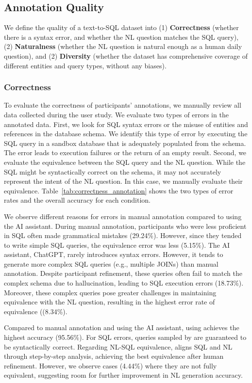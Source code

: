 \subsection{Annotation Quality}
We define the quality of a text-to-SQL dataset into (1) \textbf{Correctness} (whether there is a syntax error, and whether the NL question matches the SQL query), (2) \textbf{Naturalness} (whether the NL question is natural enough as a human daily question), and (2) \textbf{Diversity} (whether the dataset has comprehensive coverage of different entities and query types, without any biases).

\subsubsection{\textbf{Correctness}}

To evaluate the correctness of participants' annotations, we manually review all data collected during the user study. We evaluate two types of errors in the annotated data. 
First, we look for SQL syntax errors or the misuse of entities and references in the database schema. 
We identify this type of error by executing the SQL query in a sandbox database that is adequately populated from the schema.
The error leads to execution failures or the return of an empty result.
Second, we evaluate the equivalence between the SQL query and the NL question. While the SQL might be syntactically correct on the schema, it may not accurately represent the intent of the NL question. In this case, we manually evaluate their equivalence.
Table~\ref{tab:correctness_annotation} shows the two types of error rates and the overall accuracy for each condition.

We observe different reasons for errors in manual annotation compared to using the AI assistant. During manual annotation, participants who were less proficient in SQL often made grammatical mistakes (29.24\%). However, since they tended to write simple SQL queries, the equivalence error was less (5.15\%).
The AI assistant, ChatGPT, rarely introduces syntax errors. However, it tends to generate more complex SQL queries (e.g., multiple JOINs) than manual annotation. Despite participant refinement, these queries often fail to match the complex schema due to hallucination, leading to SQL execution errors (18.73\%). Moreover, these complex queries pose greater challenges in maintaining equivalence with the NL question, resulting in the highest error rate of equivalence ((8.34\%).

Compared to manual annotation and using the AI assistant, using {\tool} achieves the highest accuracy (95.56\%). For SQL errors, queries sampled by {\tool} are guaranteed to be syntactically correct. Regarding NL-SQL equivalence, {\tool} aligns SQL and NL through step-by-step analysis, achieving the best equivalence after human refinement. However, we observe cases (4.44\%) where they are not fully equivalent, suggesting room for further improvement in NL generation accuracy.



